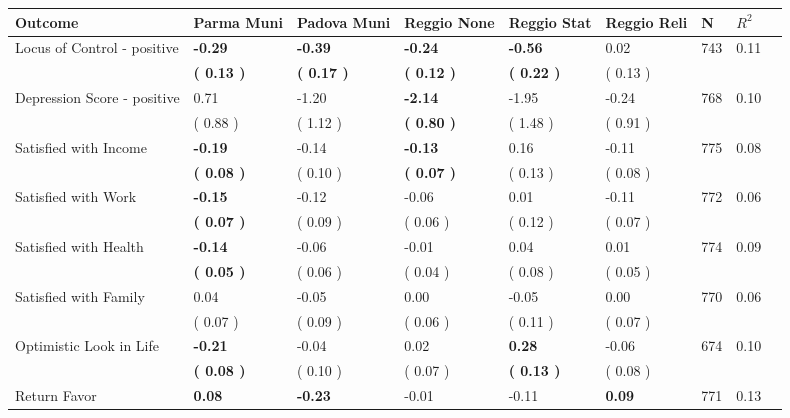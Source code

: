 \begin{tabular}{L{6.2cm} C{1.8cm} C{1.8cm} C{1.8cm} C{1.8cm} C{1.8cm} C{1.8cm} C{0.3cm} C{0.3cm}}
\toprule
 \textbf{Outcome} & \textbf{Parma Muni} & \textbf{Padova Muni} & \textbf{Reggio None} & \textbf{Reggio Stat} & \textbf{Reggio Reli} & \textbf{N} & \textbf{$ R^2$} \\
\midrule
Locus of Control - positive & \textbf{    -0.29} & \textbf{    -0.39} & \textbf{    -0.24} & \textbf{    -0.56} &      0.02  & 743 &       0.11 \\ 
 & \textbf{(     0.13 )} & \textbf{(     0.17 )} & \textbf{(     0.12 )} & \textbf{(     0.22 )} & (     0.13 )  & \\
Depression Score - positive &      0.71 &     -1.20 & \textbf{    -2.14} &     -1.95 &     -0.24  & 768 &       0.10 \\ 
 & (     0.88 ) & (     1.12 ) & \textbf{(     0.80 )} & (     1.48 ) & (     0.91 )  & \\
Satisfied with Income & \textbf{    -0.19} &     -0.14 & \textbf{    -0.13} &      0.16 &     -0.11  & 775 &       0.08 \\ 
 & \textbf{(     0.08 )} & (     0.10 ) & \textbf{(     0.07 )} & (     0.13 ) & (     0.08 )  & \\
Satisfied with Work & \textbf{    -0.15} &     -0.12 &     -0.06 &      0.01 &     -0.11  & 772 &       0.06 \\ 
 & \textbf{(     0.07 )} & (     0.09 ) & (     0.06 ) & (     0.12 ) & (     0.07 )  & \\
Satisfied with Health & \textbf{    -0.14} &     -0.06 &     -0.01 &      0.04 &      0.01  & 774 &       0.09 \\ 
 & \textbf{(     0.05 )} & (     0.06 ) & (     0.04 ) & (     0.08 ) & (     0.05 )  & \\
Satisfied with Family &      0.04 &     -0.05 &      0.00 &     -0.05 &      0.00  & 770 &       0.06 \\ 
 & (     0.07 ) & (     0.09 ) & (     0.06 ) & (     0.11 ) & (     0.07 )  & \\
Optimistic Look in Life & \textbf{    -0.21} &     -0.04 &      0.02 & \textbf{     0.28} &     -0.06  & 674 &       0.10 \\ 
 & \textbf{(     0.08 )} & (     0.10 ) & (     0.07 ) & \textbf{(     0.13 )} & (     0.08 )  & \\
Return Favor & \textbf{     0.08} & \textbf{    -0.23} &     -0.01 &     -0.11 & \textbf{     0.09}  & 771 &       0.13 \\ 

\end{tabular}
